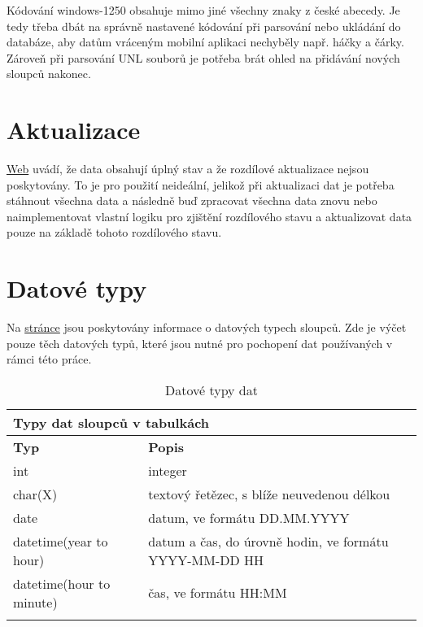 \noindent Kódování windows-1250 obsahuje mimo jiné všechny znaky z české abecedy. Je tedy třeba dbát na správně nastavené kódování při parsování nebo ukládání do databáze, aby datům vráceným mobilní aplikaci nechyběly např. háčky a čárky. Zároveň při parsování UNL souborů je potřeba brát ohled na přidávání nových sloupců nakonec.

\section{Aktualizace}

\href{https://www.psp.cz/sqw/hp.sqw?k=1300}{\color{blue}Web} uvádí, že data obsahují úplný stav a že rozdílové aktualizace nejsou poskytovány. To je pro použití neideální, jelikož při aktualizaci dat je potřeba stáhnout všechna data a následně buď zpracovat všechna data znovu nebo naimplementovat vlastní logiku pro zjištění rozdílového stavu a aktualizovat data pouze na základě tohoto rozdílového stavu. 

\section{Datové typy}
Na \href{https://www.psp.cz/sqw/hp.sqw?k=1300}{\color{blue}stránce} jsou poskytovány informace o datových typech sloupců. Zde je výčet pouze těch datových typů, které jsou nutné pro pochopení dat používaných v rámci této práce.

\begin{longtable}{|l|p{9cm}|} \hline
	\multicolumn{2}{|l|}{\textbf{Typy dat sloupců v tabulkách}} \\ \hline
	\textbf{Typ} & \textbf{Popis} \\ \hline
	
	int	& integer \\ \hline
	
	char(X)		& textový řetězec, s blíže neuvedenou délkou
	\\ \hline

	date	& datum, ve formátu DD.MM.YYYY
	\\ \hline	
	
	datetime(year to hour)		& datum a čas, do úrovně hodin, ve formátu YYYY-MM-DD HH
	
	\\ \hline
	
	datetime(hour to minute)		& čas, ve formátu HH:MM
	\\ \hline
	
	\caption{Datové typy dat}
	\label{table:data_types}
\end{longtable}

